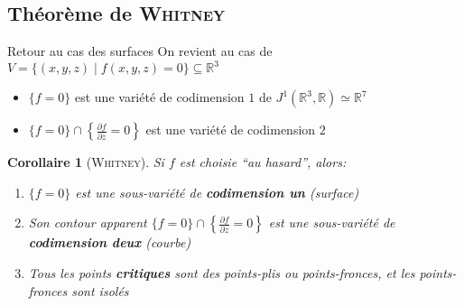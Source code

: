 \documentclass[compress, usepdftitle=false]{beamer}
\newcommand{\R}{\mathbb{R}}
\newtheorem{cor}{Corollaire}
\theoremstyle{definition}
\begin{document}
\subsection{Théorème de \textsc{Whitney}}
\begin{frame}{Retour au cas des surfaces}
    On revient au cas de $V = \{ (x,y,z)\mid f(x,y,z)=0 \} \subseteq \R^3$

    \pause
    \begin{itemize}
        \item $\{ f=0 \}$ est une variété de codimension $1$ de $J^1(\R^3,\R) \simeq \R^7$
        \item $\{ f=0 \}\cap \left\{ \frac{\partial f}{\partial z}=0 \right\}$ est une variété de codimension $2$
    \end{itemize}

    \pause
    \begin{cor}[\textsc{Whitney}]
        Si $f$ est choisie ``au hasard'', alors:
        \begin{enumerate}
            \item $\{f=0\}$ est une sous-variété de \textbf{codimension un} (\alert{surface})
            \item Son contour apparent $\{f=0\}\cap \left\{\frac{\partial f}{\partial z}=0\right\}$ est une sous-variété de \textbf{codimension deux} (\alert{courbe})
            \item Tous les points \textbf{critiques} sont des points-plis ou points-fronces, et les points-fronces sont isolés
        \end{enumerate}
    \end{cor}
\end{frame}
\end{document}
